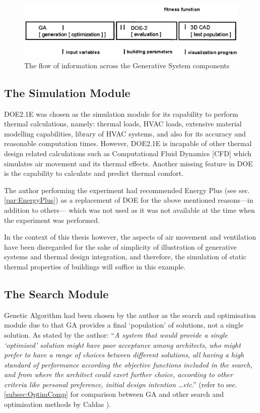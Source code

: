\begin{figure}[htbp]
\centering
\includegraphics[width=\textwidth]{./Images/15-FitnessFunction}
\caption[GS Information Flow]{The flow of information across the Generative System components \cite{caldas01}}
\label{fig:GSfitFun}
\end{figure}

\subsection{The Simulation Module}
DOE2.1E was chosen as the simulation module for its capability to perform thermal calculations, namely: thermal loads, HVAC loads, extensive material modelling capabilities, library of HVAC systems, and also for its accuracy and reasonable computation times. However, DOE2.1E is incapable of other thermal design related calculations such as Computational Fluid Dynamics [CFD] which simulates air movement and its thermal effects. Another missing feature in DOE is the capability to calculate and predict thermal comfort. 

The author performing the experiment had recommended Energy Plus (see sec. \ref{par:EnergyPlus}) as a replacement of DOE for the above mentioned reasons---in addition to others--- which was not used as it was not available at the time when the experiment was performed.

In the context of this thesis however, the aspects of air movement and ventilation have been disregarded for the sake of simplicity of illustration of generative systems and thermal design integration, and therefore, the simulation of static thermal properties of buildings will suffice in this example.

\subsection{The Search Module}

\label{subsec:GA2}
Genetic Algorithm had been chosen by the author as the search and optimisation module due to that GA provides a final `population' of solutions, not a single solution. As stated by the author: ``\emph{A system that would provide a single `optimised' solution might have poor acceptance among architects, who might prefer to have a range of choices between different solutions, all having a high standard of performance according the objective functions included in the search, and from where the architect could exert further choice, according to other criteria like personal preference, initial design intention \ldots etc}.'' (refer to sec. \ref{subsec:OptimComp} for comparison between GA and other search and optimisation methods by Caldas \cite{caldas01}).

